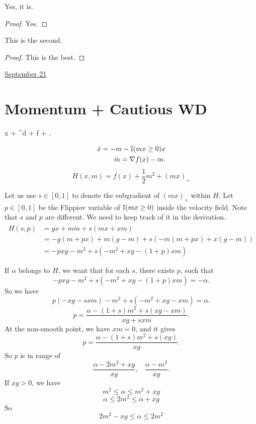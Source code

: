 \documentclass[letterpaper,11pt]{article}
\begin{document}
\begin{thm}
    Yes, it is. 
\end{thm}
\begin{proof} 
    Yes. 
\end{proof}    

\begin{theorem}
    This is the second. 
\end{theorem}
\begin{proof}
    This is the best. 
\end{proof}     





\clearpage


\href{run:2025-09-21-momentum_cwd.tex}{\Huge September 21} 

\section{Momentum + Cautious WD}

\bb
\dot x + \RR^d + \dd f + \E[x]. 
\ee 

\begin{align}
    \dot x = - m - \mathbb{I}(mx\geq 0) x \\ 
    \dot m = \nabla f(x) - m. 
\end{align}
$$
H(x, m) = f(x) + \frac{1}{2} m^2 + (mx)_+
$$

Let us use $s \in[0,1]$ to denote the subgradient of $(mx)_+$ within $H$. Let $p \in[0,1]$ be the Flippiov variable of $\mathbb{I}(mx \geq 0)$ inside the velocity field. Note that $s$ and $p$ are different. We need to keep track of it in the derivation. 
\begin{align*}
\dot H(s,p) &  =  g \dot x + m \dot m + s (m \dot x + x \dot m) \\ 
& = -g (m + p x) + m(g - m) + s (-m (m + p x) + x (g - m) )\\
& = - p x g - m^2 + s (- m^2 + xg - (1+p)xm)
\end{align*}

If $\alpha$ belongs to $\dot H$, we want that for each $s$, there exists $p$, such that 
$$
- p x g - m^2 + s (- m^2 + xg - (1+p)xm) = -\alpha.
$$
So we have 
$$
p (-xg - s x m ) - m^2 + s (-m^2 + xg - xm) = \alpha. 
$$
$$
p = \frac{\alpha -(1+s) m^2 + s (xg - xm)}{xg +  s xm}. 
$$
At the non-smooth point, we have $xm =0$, and it gives 
$$
p = \frac{\alpha -(1+s) m^2 + s (xg)}{xg}.  
$$
So $p$ is in range of 
$$
\frac{\alpha - 2m^2 + xg}{xg}, ~~~~ 
\frac{\alpha - m^2 }{xg}. 
$$
If $xg >0$, we have 
$$
m^2 \leq \alpha \leq m^2 + xg
$$
$$
\alpha \leq 2m^2 \leq \alpha + xg 
$$
So 
$$
2m^2  - xg \leq \alpha \leq 2 m^2
$$
\end{document}
